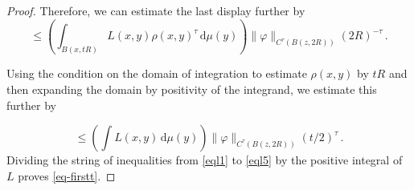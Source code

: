 \begin{proof}
Therefore, we can estimate the last display further by
       \begin{equation}\label{eql4}
         \le \left(\int_{B(x, tR)} L(x,y)
          \rho(x,y)^\tau \, \mathrm{d}\mu(y) \right)\|\varphi\|_{C^\tau(B(z, 2R))}(2R)^{-\tau}\, .
    \end{equation}

  Using the condition on the domain of integration to estimate $\rho(x,y)$ by $tR$ and then expanding the domain by positivity of the integrand, we estimate this further by

   \begin{equation}\label{eql5}
         \le \left(\int L(x,y) \, \mathrm{d}\mu(y)\right)
         \|\varphi\|_{C^\tau(B(z, 2R))} (t/2)^{\tau} \, .
    \end{equation}
 Dividing the string of inequalities from \eqref{eql1} to
\eqref{eql5} by the positive integral of $L$ proves \eqref{eq-firstt}.



\end{proof}
